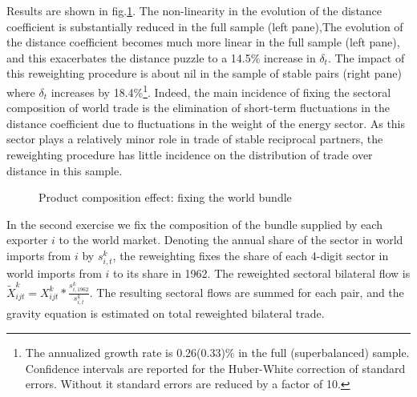 \documentclass[12pt,twoside,a4paper,notitlepage]{article}
\begin{document}
Results are shown in fig.\ref{fig:compworld}.
 The non-linearity in the evolution of the distance coefficient is substantially reduced in the full sample (left pane),\fi The evolution of the distance coefficient becomes much more linear in the full sample (left pane), and this exacerbates the distance puzzle to a 14.5\% increase in $\delta_t$.
The impact of this reweighting procedure is about nil in the sample of stable pairs (right pane) where $\delta_t$ increases by 18.4\%\footnote{The annualized growth rate is 0.26(0.33)\% in the full (superbalanced) sample.
Confidence intervals are reported for the Huber-White correction of standard errors.
Without it standard errors are reduced by a factor of 10.}.
Indeed, the main incidence of fixing the sectoral composition of world trade is the elimination of short-term fluctuations in the distance coefficient due to fluctuations in the weight of the energy sector.
As this sector plays a relatively minor role in trade of stable reciprocal partners, the reweighting procedure has little incidence on the distribution of trade over distance in this sample.

\begin{figure}[h!]
\caption{Product composition effect: fixing the world bundle  \label{fig:compworld}}
\begin{center}
\setlength{\fboxrule}{1pt} %
\setlength{\fboxsep}{.1in} %
\end{center}
\end{figure}

In the second exercise we fix the composition of the bundle supplied by each exporter $i$ to the world market.
Denoting the annual share of the sector in world imports from $i$ by $s^{k}_{i,t}$, the reweighting fixes the share of each 4-digit sector in world imports from $i$ to its share in 1962.
The reweighted sectoral bilateral flow is $\tilde{X}^k_{ijt}=X^k_{ijt}*\frac{s^k_{i,1962}}{s^k_{i,t}}$.
The resulting sectoral flows are summed for each pair, and the gravity equation is estimated on total reweighted bilateral trade.
 
\end{document}
